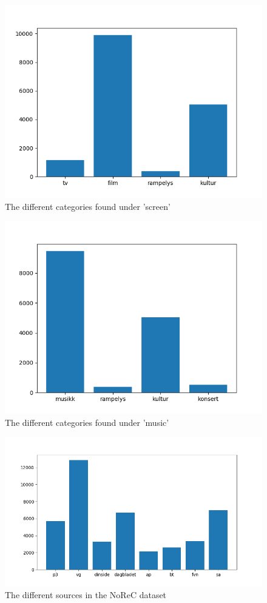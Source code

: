 \begin{figure}[h!]
	\centering
	\includegraphics[scale=0.5]{img/screen_categories}
	\caption{The different categories found under 'screen'}
	\label{fig:screen}
\end{figure}%
\begin{figure}[h!]
	\centering
	\includegraphics[scale=0.5]{img/music_categories}
	\caption{The different categories found under 'music'}
	\label{fig:music}
\end{figure}%
\begin{figure}[h!]
	\centering
	\includegraphics[scale=0.5]{img/src_dist_new}
	\caption{The different sources in the NoReC dataset}
	\label{fig:sources}
\end{figure}%

